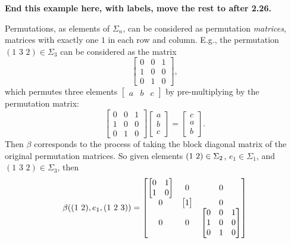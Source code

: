 \begin{example}
 \textbf{End this example here, with labels, move the rest to after 2.26.}

\begin{remark}\label{Rem:perm_matrices}
Permutations, as elements of $\Sigma_n$, can be considered as permutation \emph{matrices}, matrices with exactly one $1$ in each row and column. E.g., the permutation $(1 \,\, 3 \,\, 2) \in \Sigma_3$ can be considered as the matrix
  \[
  \begin{bmatrix}
  0 & 0 & 1 \\
  1 & 0 & 0 \\
  0 & 1 & 0
  \end{bmatrix},
  \]
which permutes three elements $  \begin{bmatrix} a & b & c \end{bmatrix}$ by pre-multiplying by the permutation matrix:
  \[
  \begin{bmatrix}
  0 & 0 & 1 \\
  1 & 0 & 0 \\
  0 & 1 & 0
  \end{bmatrix}
  \begin{bmatrix}
  a \\ b \\ c
  \end{bmatrix}
  =
  \begin{bmatrix}
  c \\ a \\ b
  \end{bmatrix}.
  \]
Then $\beta$ corresponds to the process of taking the block diagonal matrix of the original permutation matrices. So given elements $( 1 \, \, 2 ) \in \Sigma_2$, $e_1 \in \Sigma_1$, and $(1 \,\, 3 \,\, 2) \in \Sigma_3$, then
  \begin{align*}
  \beta(\trans{1}{2},e_1,(1 \,\, 2 \,\, 3)) &=
  \begin{bmatrix}
  \begin{bmatrix}
  0 & 1 \\
  1 & 0
  \end{bmatrix} & 0 & 0 \\
  0 & \begin{bmatrix} 1 \end{bmatrix} & 0 \\
  0 & 0 &   \begin{bmatrix}
  0 & 0 & 1 \\
  1 & 0 & 0 \\
  0 & 1 & 0
  \end{bmatrix}
  \end{bmatrix}\\

\end{align*}
\end{remark}
\end{example}
